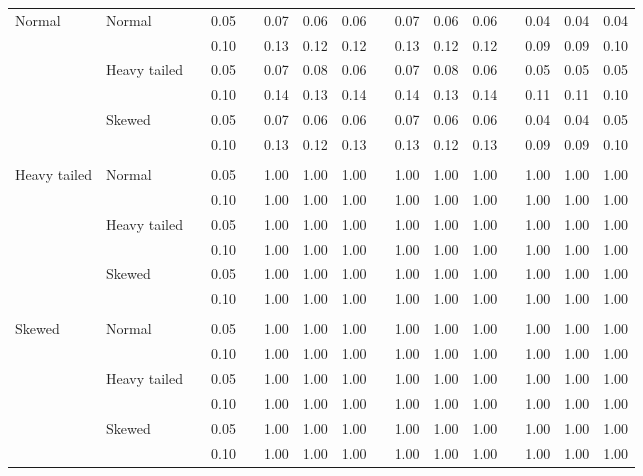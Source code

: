 \begin{table}[ht]
\begin{scriptsize}
\begin{center}
\begin{tabular}{ll p{.1cm} c p{.1cm} rrr p{.1cm} rrr p{.1cm} rrr}
\rowcolor{gray!20} Normal       & Normal       && 0.05 && 0.07 & 0.06 & 0.06 && 0.07 & 0.06 & 0.06 && 0.04 & 0.04 & 0.04 \\ 
\rowcolor{gray!20}             &              && 0.10 && 0.13 & 0.12 & 0.12 && 0.13 & 0.12 & 0.12 && 0.09 & 0.09 & 0.10 \\ 
\rowcolor{gray!20}             & Heavy tailed && 0.05 && 0.07 & 0.08 & 0.06 && 0.07 & 0.08 & 0.06 && 0.05 & 0.05 & 0.05 \\ 
\rowcolor{gray!20}             &              && 0.10 && 0.14 & 0.13 & 0.14 && 0.14 & 0.13 & 0.14 && 0.11 & 0.11 & 0.10 \\ 
\rowcolor{gray!20}             & Skewed       && 0.05 && 0.07 & 0.06 & 0.06 && 0.07 & 0.06 & 0.06 && 0.04 & 0.04 & 0.05 \\ 
\rowcolor{gray!20}             &              && 0.10 && 0.13 & 0.12 & 0.13 && 0.13 & 0.12 & 0.13 && 0.09 & 0.09 & 0.10 \\ 
             &&&&&&&&&&&&&&&\\
Heavy tailed & Normal       && 0.05 && 1.00 & 1.00 & 1.00 && 1.00 & 1.00 & 1.00 && 1.00 & 1.00 & 1.00 \\ 
             &              && 0.10 && 1.00 & 1.00 & 1.00 && 1.00 & 1.00 & 1.00 && 1.00 & 1.00 & 1.00 \\ 
             & Heavy tailed && 0.05 && 1.00 & 1.00 & 1.00 && 1.00 & 1.00 & 1.00 && 1.00 & 1.00 & 1.00 \\ 
             &              && 0.10 && 1.00 & 1.00 & 1.00 && 1.00 & 1.00 & 1.00 && 1.00 & 1.00 & 1.00 \\ 
             & Skewed       && 0.05 && 1.00 & 1.00 & 1.00 && 1.00 & 1.00 & 1.00 && 1.00 & 1.00 & 1.00 \\ 
             &              && 0.10 && 1.00 & 1.00 & 1.00 && 1.00 & 1.00 & 1.00 && 1.00 & 1.00 & 1.00 \\ 
             &&&&&&&&&&&&&&&\\
Skewed       & Normal       && 0.05 && 1.00 & 1.00 & 1.00 && 1.00 & 1.00 & 1.00 && 1.00 & 1.00 & 1.00 \\ 
             &              && 0.10 && 1.00 & 1.00 & 1.00 && 1.00 & 1.00 & 1.00 && 1.00 & 1.00 & 1.00 \\ 
             & Heavy tailed && 0.05 && 1.00 & 1.00 & 1.00 && 1.00 & 1.00 & 1.00 && 1.00 & 1.00 & 1.00 \\ 
             &              && 0.10 && 1.00 & 1.00 & 1.00 && 1.00 & 1.00 & 1.00 && 1.00 & 1.00 & 1.00 \\ 
             & Skewed       && 0.05 && 1.00 & 1.00 & 1.00 && 1.00 & 1.00 & 1.00 && 1.00 & 1.00 & 1.00 \\ 
             &              && 0.10 && 1.00 & 1.00 & 1.00 && 1.00 & 1.00 & 1.00 && 1.00 & 1.00 & 1.00 \\ 


\end{tabular}
\end{center}
\end{scriptsize}
\end{table}
